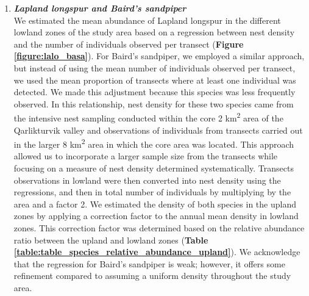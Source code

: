 \documentclass[a4paper,twoside,12pt]{article}
\begin{document}
\begin{enumerate}[label=\alph*.]
                \item[] \textit{\textbf{Lapland longspur and Baird’s sandpiper}}\\
                We estimated the mean abundance of Lapland longspur in the different lowland zones of the study area based on a regression between nest density and the number of individuals observed per transect (\textbf{Figure \ref{figure:lalo_basa}}). For Baird’s sandpiper, we employed a similar approach, but instead of using the mean number of individuals observed per transect, we used the mean proportion of transects where at least one individual was detected. We made this adjustment because this species was less frequently observed. In this relationship, nest density for these two species came from the intensive nest sampling conducted within the core 2 km\textsuperscript{2} area of the Qarlikturvik valley and observations of individuals from transects carried out in the larger 8 km\textsuperscript{2} area in which the core area was located. This approach allowed us to incorporate a larger sample size from the transects while focusing on a measure of nest density determined systematically. Transects observations in lowland were then converted into nest density using the regressions, and then in total number of individuals by multiplying by the area and a factor 2. We estimated the density of both species in the upland zones by applying a correction factor to the annual mean density in lowland zones. This correction factor was determined based on the relative abundance ratio between the upland and lowland zones (\textbf{Table \ref{table:table_species_relative_abundance_upland}}). We acknowledge that the regression for Baird’s sandpiper is weak; however, it offers some refinement compared to assuming a uniform density throughout the study area. 
                

\end{enumerate}
\end{document}
